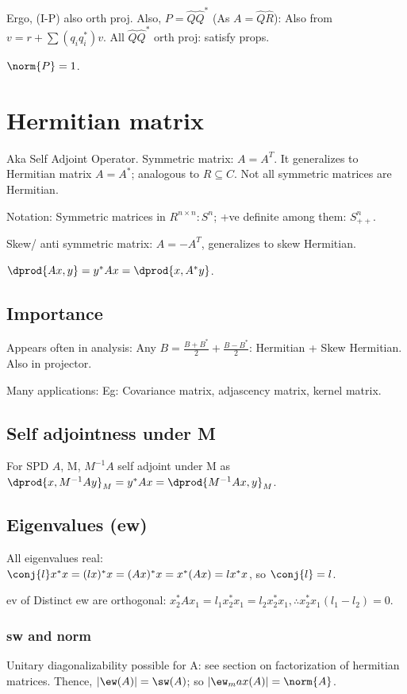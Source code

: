 \documentclass[oneside, article]{memoir}
\begin{document}
Ergo, (I-P) also orth proj. Also, $P = \hat{Q}\hat{Q}^{*}$ (As $A = \hat{Q}\hat{R}$): Also from $v = r + \sum (q_{i}q_{i}^{*})v$. All $\hat{Q}\hat{Q}^{*}$ orth proj: satisfy props.

$\norm{P} = 1$. \why

\section{Hermitian matrix}
Aka Self Adjoint Operator. Symmetric matrix: $A=A^{T}$. It generalizes to Hermitian matrix $A=A^{*}$; analogous to $R \subseteq C$. Not all symmetric matrices are Hermitian.

Notation: Symmetric matrices in $R^{n \times n}: S^{n}$; +ve definite among them: $S^{n}_{++}$.

Skew/ anti symmetric matrix: $A= -A^{T}$, generalizes to skew Hermitian.

$\dprod{Ax, y} = y^{*}Ax = \dprod{x, A^{*}y}$.

\subsection{Importance}
Appears often in analysis: Any $B = \frac{B+B^{*}}{2} + \frac{B-B^{*}}{2}$: Hermitian + Skew Hermitian. Also in projector.

Many applications: Eg: Covariance matrix, adjascency matrix, kernel matrix.

\subsection{Self adjointness under M}
For SPD $A$, M, $M^{-1}A$ self adjoint under M as $\dprod{x, M^{-1}Ay}_{M} = y^{*}Ax = \dprod{M^{-1}Ax, y}_{M}$.

\subsection{Eigenvalues (ew)}
All eigenvalues real: \\
$\conj{l}x^{*}x = (lx)^{*}x = (Ax)^{*}x = x^{*}(Ax) = lx^{*}x$, so $\conj{l}=l$.

ev of Distinct ew are orthogonal: $x_{2}^{*}Ax_{1} = l_{1}x_{2}^{*}x_{1} = l_{2}x_{2}^{*}x_{1}, \therefore x_{2}^{*}x_{1}(l_{1}-l_{2}) = 0$.

\subsubsection{sw and norm}
Unitary diagonalizability possible for A: see section on factorization of hermitian matrices. Thence, $|\ew(A)| = \sw(A)$; so $|\ew_max(A)| = \norm{A}$.
\end{document}
